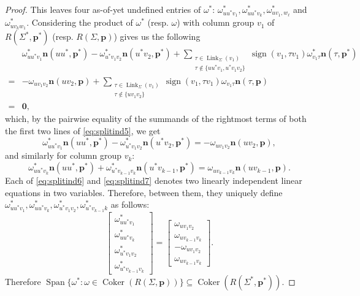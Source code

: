 \documentclass[11pt]{amsart}
\theoremstyle{definition}
\theoremstyle{remark}
\DeclareMathOperator{\sign}{sign}
\DeclareMathOperator{\Span}{Span}
\DeclareMathOperator{\coker}{Coker}
\DeclareMathOperator{\link}{Link}
\begin{document}
\begin{proof}
    This leaves four as-of-yet undefined entries of $\omega^*$: $\omega_{uu^*v_1}^*,\omega_{uu^*v_k}^*,\omega_{uv_1,w_{\ell}}^*$ and $\omega_{uv_kw_1}^*$.
    Considering the product of $\omega^*$ (resp. $\omega$) with column group $v_1$ of $R(\Sigma^*,\mathbf{p}^*)$ (resp. $R(\Sigma,\mathbf{p})$) gives us the following
    \begin{equation}\label{eq:splitind5}
    \begin{split}
        & \omega_{uu^*v_1}^*\mathbf{n}(uu^*,\mathbf{p}^*) - \omega_{u^*v_1v_2}^*\mathbf{n}(u^*v_2,\mathbf{p}^*) + \sum\limits_{\substack{\tau\in\link_{\Sigma}(v_1) \\ \tau\not\in\{uu^*v_1,u^*v_1v_2\}}}\sign(v_1,\tau v_1)\omega_{v_1\tau}^*\mathbf{n}(\tau,\mathbf{p}^*) \\
        =& - \omega_{uv_1v_2}\mathbf{n}(uv_2,\mathbf{p}) + \sum\limits_{\substack{\tau\in\link_{\Sigma}(v_1) \\ \tau\not\in\{uv_1v_2\}}}\sign(v_1,\tau v_1)\omega_{v_1\tau}\mathbf{n}(\tau,\mathbf{p}) \\
        =& \mathbf{0},
    \end{split}
    \end{equation}
    which, by the pairwise equality of the summands of the rightmost terms of both the first two lines of \cref{eq:splitind5}, we get
    \begin{equation}\label{eq:splitind6}
        \omega_{uu^*v_1}^*\mathbf{n}(uu^*,\mathbf{p}^*) - \omega_{u^*v_1v_2}^*\mathbf{n}(u^*v_2,\mathbf{p}^*) = -\omega_{uv_1v_2}\mathbf{n}(uv_2,\mathbf{p}),
    \end{equation}
    and similarly for column group $v_k$:
    \begin{equation}\label{eq:splitind7}
        \omega_{uu^*v_k}^*\mathbf{n}(uu^*,\mathbf{p}^*) + \omega_{u^*v_{k-1}v_k}^*\mathbf{n}(u^*v_{k-1},\mathbf{p}^*) = \omega_{uv_{k-1}v_k}\mathbf{n}(uv_{k-1},\mathbf{p}).
    \end{equation}
    Each of \cref{eq:splitind6} and \cref{eq:splitind7} denotes two linearly independent linear equations in two variables.
    Therefore, between them, they uniquely define $\omega_{uu^*v_1}^*, \omega_{uu^*v_k}^*,\omega_{u^*v_1v_2}^*,\omega_{u^*v_{k-1}k}^*$ as follows:
    \begin{equation}\label{eq:splitind8}
        \begin{bmatrix}
            \omega_{uu^*v_1}^* \\ \omega_{uu^*v_k}^* \\ \omega_{u^*v_1v_2}^* \\ \omega_{u^*v_{k-1}v_k}^*
        \end{bmatrix}
        = \begin{bmatrix}
            \omega_{uv_1v_2} \\ \omega_{uv_{k-1}v_k} \\ -\omega_{uv_1v_2} \\ \omega_{uv_{k-1}v_k}
        \end{bmatrix}.
    \end{equation}
    Therefore $\Span\{\omega^*:\omega\in\coker(R(\Sigma,\mathbf{p}))\}\subseteq\coker(R(\Sigma^*,\mathbf{p}^*))$.


\end{proof}
\end{document}
